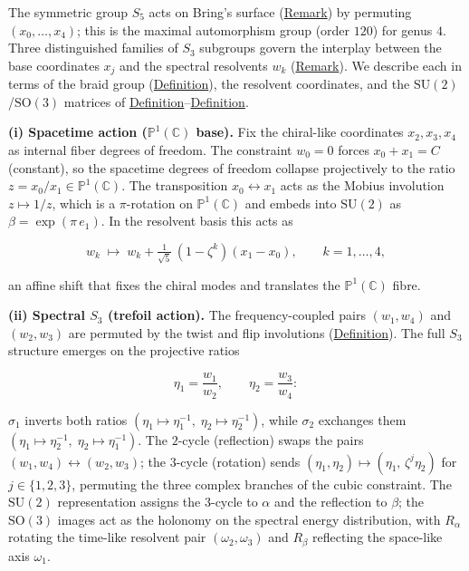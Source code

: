 \begin{remark}
  \label{rem:braid-group-action}
The symmetric group $S_5$ acts on Bring's surface
(\hyperref[rem:brings-curve]{Remark}) by permuting
$(x_0,\dots,x_4)$; this is the maximal automorphism group
(order $120$) for genus $4$.  Three distinguished families of $S_3$
subgroups govern the interplay between the base coordinates $x_j$ and the
spectral resolvents $w_k$
(\hyperref[rem:lagrange-resolvents]{Remark}).  We describe each in terms of the
braid group (\hyperref[def:braid-group]{Definition}), the resolvent coordinates,
and the $\mathrm{SU}(2)$/$\mathrm{SO}(3)$ matrices of
\hyperref[def:su2-generators]{Definition}--\hyperref[def:so3-generators]{Definition}.

\textbf{(i) Spacetime action ($\mathbb{P}^1(\mathbb{C})$ base).}
Fix the chiral-like coordinates $x_2,x_3,x_4$ as internal fiber
degrees of freedom.  The constraint
$w_0=0$ forces $x_0+x_1=C$ (constant), so
the spacetime degrees of freedom collapse projectively to the ratio
$z=x_0/x_1\in\mathbb{P}^1(\mathbb{C})$.  The transposition
$x_0\leftrightarrow x_1$ acts as the Mobius involution
$z\mapsto 1/z$, which is a $\pi$-rotation on $\mathbb{P}^1(\mathbb{C})$ and embeds
into $\mathrm{SU}(2)$ as $\beta=\exp(\pi\,e_1)$.
In the resolvent basis this acts as

\begin{equation}\label{eq:spacetime-shift}
  w_k\;\longmapsto\;
  w_k+\tfrac{1}{\sqrt{5}}\,(1-\zeta^k)(x_1-x_0),
  \qquad k=1,\dots,4,
\end{equation}

an affine shift that fixes the chiral modes and translates the
$\mathbb{P}^1(\mathbb{C})$ fibre.

\textbf{(ii) Spectral $S_3$ (trefoil action).}
The frequency-coupled pairs $(w_1,w_4)$ and $(w_2,w_3)$ are permuted by
the twist and flip involutions
(\hyperref[def:braid-twist-flip]{Definition}).
The full
$S_3$ structure emerges on the projective ratios

\[
\eta_1=\frac{w_1}{w_2},\qquad\eta_2=\frac{w_3}{w_4}:
\]

$\sigma_1$ inverts both ratios $(\eta_1\mapsto\eta_1^{-1},\;
\eta_2\mapsto\eta_2^{-1})$, while $\sigma_2$ exchanges them
$(\eta_1\mapsto\eta_2^{-1},\;\eta_2\mapsto\eta_1^{-1})$.  The
$2$-cycle (reflection) swaps the pairs
$(w_1,w_4)\leftrightarrow(w_2,w_3)$; the $3$-cycle (rotation) sends
$(\eta_1,\eta_2)\mapsto(\eta_1,\,\zeta^j\eta_2)$ for $j\in\{1,2,3\}$,
permuting the three complex branches of the cubic
constraint.  The
$\mathrm{SU}(2)$ representation assigns the $3$-cycle to
$\alpha$ and the reflection to
$\beta$; the $\mathrm{SO}(3)$
images act as the holonomy on the spectral
energy distribution, with $R_\alpha$ rotating the time-like resolvent
pair $(\omega_2,\omega_3)$ and $R_\beta$ reflecting the space-like
axis $\omega_1$.


\end{remark}
